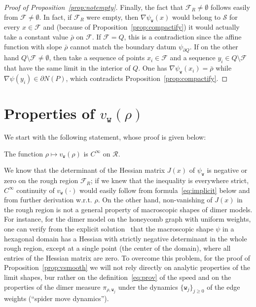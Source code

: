 \documentclass[AHL,Unicode,longabstracts,published]{cedram}
\newcommand{\psiw}{\psi_{\mathtt w}}
\newcommand{\ttw}{\mathtt{w}}
\newcommand{\clS}{\mathcal{S}}
\newcommand{\clR}{\mathcal{R}}
\newcommand{\clF}{\mathcal{F}}
\newcommand{\ttw}{\mathtt{w}}
\begin{document}
\begin{proof}[Proof of Proposition~\ref{prop:notempty}]
Finally, the fact that $\clF_R\ne\emptyset$ follows easily from $\clF\ne\emptyset$. In fact, if $\clF_R$ were empty, then $\nabla \psi_{\ttw}(x)$ would belong to $\clS$ for every $x\in \clF$ and (because of Proposition~\ref{prop:compactify}) it would actually take a constant value $\bar\rho$ on $\clF$. If $\clF=Q$, this is a contradiction since the affine function with slope $\bar \rho$ cannot match the boundary datum $\psi_{\partial Q}$. If on the other hand $Q\setminus \clF\ne\emptyset$, then take a sequence of points $x_i\in \clF$ and a sequence $y_i \in Q\setminus \clF$ that have the same limit in the interior of $Q$. One has $\nabla\psiw(x_i)=\bar \rho$ while $\nabla\psi(y_i)\in \partial N(P)$, which contradicts Proposition~\ref{prop:compactify}.
\end{proof}


\section{Properties of \texorpdfstring{$v_{\ttw}(\rho)$}{v mathtt w(rho)}} \label{sec:Properties}
\label{sec:proprieta}
We start with the following statement, whose proof is given below:
\begin{prop}\label{prop:vsmooth}
The function $\rho\mapsto v_{\ttw}(\rho)$ is $C^\infty$ on $\clR$.
\end{prop}

\begin{rema}
We know that the determinant of the Hessian matrix $J(x)$ of $\psi_{\ttw}$ is negative or zero on the rough region $\clF_R$; if we knew that the inequality is everywhere strict, $C^\infty$ continuity of $v_{\ttw}(\cdot)$ would easily follow from formula~\eqref{eq:implicit} below and from further derivation w.r.t. $\rho$. On the other hand, non-vanishing of $J(x)$ in the rough region is not a general property of macroscopic shapes of dimer models. For instance, for the dimer model on the honeycomb graph with uniform weights, one can verify from the explicit solution~\cite{CLP98} that the macroscopic shape $\psi$ in a hexagonal domain has a Hessian with strictly negative determinant in the whole rough region, except at a single point (the center of the domain), where all entries of the Hessian matrix are zero. To overcome this problem, for the proof of Proposition~\ref{prop:vsmooth} we will not rely directly on analytic properties of the limit shapes, bur rather on the definition~\eqref{eq:prov} of the speed and on the properties of the dimer measure $\pi_{\rho,\ttw_j}$ under the dynamics $\{\ttw_j\}_{j\ge 0}$ of the edge weights (``spider move dynamics'').
\end{rema}
\end{document}
